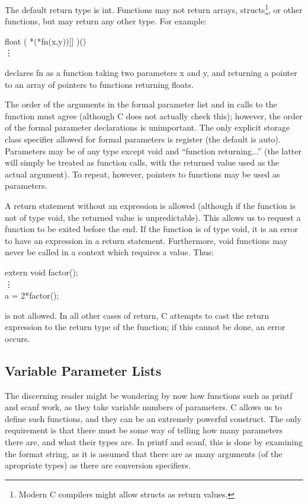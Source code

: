 The default  return type is {\cd int}. 
Functions may not return
arrays, structs\footnote{Modern C compilers might allow structs as
return values.}, or other functions, but may return any other type. For
example:
\begin{code}
float ( *(*fn(x,y))[] )()\\
\vdots
\end{code}
\noindent
     declares {\cd fn} as a  function taking  two parameters  {\cd x}
and {\cd y}, and returning a pointer to an array of pointers to
functions returning {\cd float}s.

     The order  of the  arguments in the formal parameter list and in
calls to the function  must agree  (although C  does not actually
check this); however, the order  of the  formal parameter
declarations  is  unimportant.  The  only explicit storage  class
specifier  allowed for  formal parameters is {\cd register} (the
default is {\cd auto}).  Parameters may  be of  any type  except {\cd
void}  and ``function returning...'' (the latter will  simply be
treated as function calls, with the returned value used as the actual
argument).  To repeat, however, pointers to functions may be used as
parameters.

     A {\cd return}  statement without  an expression  is allowed
(although if  the function is  not of  type {\cd void},  the
returned  value is  unpredictable).  This allows us  to request  a
function to be exited before the end. If the function is of  type
{\cd void},  it is an error to have an expression in a {\cd return}
statement.  Furthermore, {\cd void}  functions may never be called in a
context which requires a value. Thus:
\begin{code}
     extern void factor(); \\
     \vdots    \\
     a = 2*factor();
\end{code}
\noindent
     is not  allowed. In  all other  cases of  {\cd return}, C
attempts to cast the  return expression  to the return type of
the function; if this cannot be done, an error occurs.

\subsection{Variable Parameter Lists}
The discerning reader might be wondering by now how functions such as
{\cd printf} and {\cd scanf} work, as they take variable numbers of
parameters. C allows us to define such functions, and they can be an
extremely powerful construct. The only requirement is that there must
be some way of telling how many parameters there are, and what their types are. In {\cd
printf} and {\cd scanf}, this is done by examining the format string,
as it is assumed that there are as many arguments (of the apropriate types) as there are
conversion specifiers.

